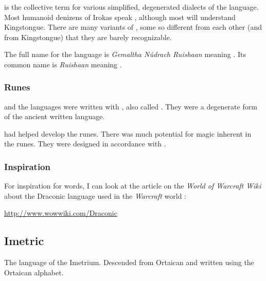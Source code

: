 \subsubsection{\CommonDraconic}
\quo{\CommonDraconic} is the collective term for various simplified, degenerated dialects of the language. 
Most humanoid denizens of Irokas speak \CommonDraconic, although most will understand Kingstongue. 
There are many variants of \CommonDraconic, some so different from each other (and from Kingstongue) that they are barely recognizable. 

The full name for the language is \emph{Gemaltha N\^udrach Ruishaan} meaning .
Its common name is \emph{Ruishaan} meaning .





\subsubsection{Runes}
\Draconic and the \quiljaaran languages were written with , also called .
They were a degenerate form of the ancient \ophidian written language.

\Sethicus had helped develop the runes. 
There was much potential for magic inherent in the runes. 
They were designed in accordance with . 





\subsubsection{Inspiration}
For inspiration for \Draconic words, I can look at the article on the \emph{World of Warcraft Wiki} about the Draconic language used in the \emph{Warcraft} world \cite{VideoGame:Warcraft}: 

\href{http://www.wowwiki.com/Draconic}{http://www.wowwiki.com/Draconic}









\subsection{Imetric}
The language of the Imetrium. 
Descended from Ortaican and written using the Ortaican alphabet. 

